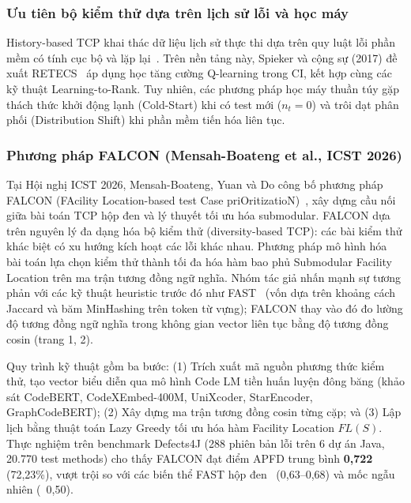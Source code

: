 \subsubsection{Ưu tiên bộ kiểm thử dựa trên lịch sử lỗi và học máy}
\label{subsubsec:history_ml_tcp}

History-based TCP khai thác dữ liệu lịch sử thực thi dựa trên quy luật lỗi phần mềm có tính cục bộ và lặp lại~\cite{kim2002history}. Trên nền tảng này, Spieker và cộng sự (2017) đề xuất RETECS~\cite{spieker2017reinforcement} áp dụng học tăng cường Q-learning trong CI, kết hợp cùng các kỹ thuật Learning-to-Rank. Tuy nhiên, các phương pháp học máy thuần túy gặp thách thức khởi động lạnh (Cold-Start) khi có test mới ($n_t = 0$) và trôi dạt phân phối (Distribution Shift) khi phần mềm tiến hóa liên tục.

\subsubsection{Phương pháp FALCON (Mensah-Boateng et al., ICST 2026)}
\label{subsubsec:falcon_method}

Tại Hội nghị ICST 2026, Mensah-Boateng, Yuan và Do công bố phương pháp FALCON (FAcility Location-based test Case priOritizatioN)~\cite{falcon2026}, xây dựng cầu nối giữa bài toán TCP hộp đen và lý thuyết tối ưu hóa submodular.
FALCON dựa trên nguyên lý đa dạng hóa bộ kiểm thử (diversity-based TCP): các bài kiểm thử khác biệt có xu hướng kích hoạt các lỗi khác nhau. Phương pháp mô hình hóa bài toán lựa chọn kiểm thử thành tối đa hóa hàm bao phủ Submodular Facility Location trên ma trận tương đồng ngữ nghĩa. Nhóm tác giả nhấn mạnh sự tương phản với các kỹ thuật heuristic trước đó như FAST~\cite{miranda2018fast} (vốn dựa trên khoảng cách Jaccard và băm MinHashing trên token từ vựng); FALCON thay vào đó đo lường độ tương đồng ngữ nghĩa trong không gian vector liên tục bằng độ tương đồng cosin (trang 1, 2).

Quy trình kỹ thuật gồm ba bước: (1) Trích xuất mã nguồn phương thức kiểm thử, tạo vector biểu diễn qua mô hình Code LM tiền huấn luyện đông băng (khảo sát CodeBERT, CodeXEmbed-400M, UniXcoder, StarEncoder, GraphCodeBERT); (2) Xây dựng ma trận tương đồng cosin từng cặp; và (3) Lập lịch bằng thuật toán Lazy Greedy tối ưu hóa hàm Facility Location $FL(S)$.
Thực nghiệm trên benchmark Defects4J (288 phiên bản lỗi trên 6 dự án Java, 20.770 test methods) cho thấy FALCON đạt điểm APFD trung bình \textbf{0,722} (72,23\%), vượt trội so với các biến thể FAST hộp đen~\cite{miranda2018fast} (0,63--0,68) và mốc ngẫu nhiên (~0,50).


